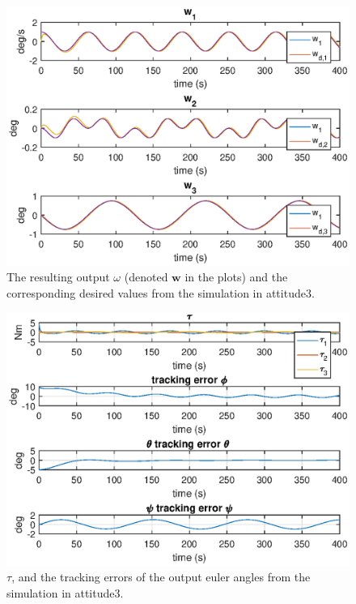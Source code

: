 \begin{figure}
	\centering
	\includegraphics[width=1.00\textwidth]{figures/3_omega.eps}
	\caption{The resulting output $\omega$ (denoted $\mathbf{w}$ in the plots) and the corresponding desired values from the simulation in attitude3.}
\label{fig:sim_attitude3_omega}
\end{figure}

\begin{figure}
	\centering
	\includegraphics[width=1.00\textwidth]{figures/3_tau_track.eps}
	\caption{ $\tau$, and the tracking errors of the output euler angles from the simulation in attitude3.}
\label{fig:sim_attitude3_track}
\end{figure}

